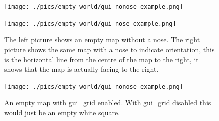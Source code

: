 \documentclass[a4paper]{report}
\begin{document}
\begin{figure}
	\centering
	\begin{minipage}[c]{0.45\linewidth}
		\centering
		\texttt{[image: ./pics/empty\_world/gui\_nonose\_example.png]}
		
	\end{minipage}%
	\hspace{0.05\linewidth}
	\begin{minipage}[c]{0.45\linewidth}
		\centering
		\texttt{[image: ./pics/empty\_world/gui\_nose\_example.png]} 
	\end{minipage}	
	\caption{The left picture shows an empty map without a nose. The right picture shows the same map with a nose to indicate orientation, this is the horizontal line from the centre of the map to the right, it shows that the map is actually facing to the right.}
		\label{fig:BuildingAWorld:EmptyWorld:Models:GUINose}
\end{figure}

\begin{figure}
	\centering
	\texttt{[image: ./pics/empty\_world/gui\_nonose\_example.png]}
	\caption{An empty map with gui\_grid enabled. With gui\_grid disabled this would just be an empty white square.}
	\label{fig:BuildingAWorld:EmptyWorld:Models:GUIGrid}
\end{figure}
\end{document}
